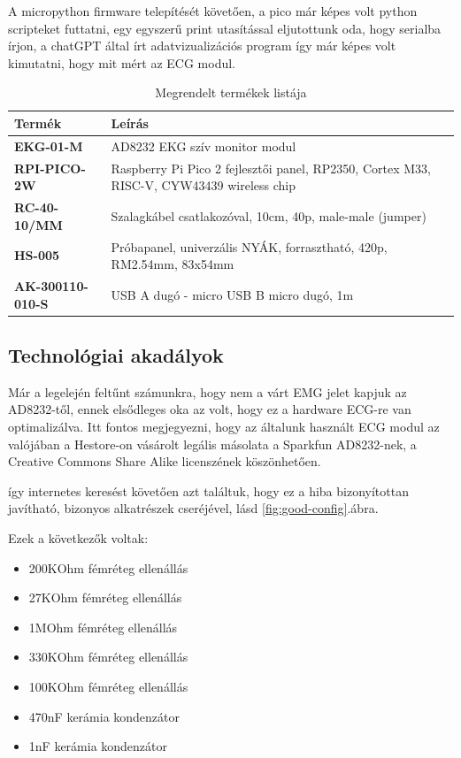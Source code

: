 A micropython firmware\cite{micropython} telepítését követően, a pico már képes volt python scripteket futtatni, egy egyszerű print utasítással eljutottunk oda, hogy serialba írjon, a chatGPT által írt adatvizualizációs program így már képes volt kimutatni, hogy mit mért az ECG modul.  
\begin{table}[H]
\centering
\begin{tabular}{|l|p{10cm}|}
\hline
\textbf{Termék} & \textbf{Leírás} \\
\hline
\textbf{EKG-01-M \cite{AD8232}} & AD8232 EKG szív monitor modul \\
\hline
\textbf{RPI-PICO-2W \cite{pico2w}} & Raspberry Pi Pico 2 fejlesztői panel, RP2350, Cortex M33, RISC-V, CYW43439 wireless chip \\
\hline
\textbf{RC-40-10/MM \cite{szalagkabel}} & Szalagkábel csatlakozóval, 10cm, 40p, male-male (jumper) \\
\hline
\textbf{HS-005 \cite{nyak}} & Próbapanel, univerzális NYÁK, forrasztható, 420p, RM2.54mm, 83x54mm \\
\hline
\textbf{AK-300110-010-S \cite{usb}} & USB A dugó - micro USB B micro dugó, 1m \\
\hline
\end{tabular}
\caption{Megrendelt termékek listája}
\end{table}


\subsection{Technológiai akadályok}
\label{sec:technologiai-akadalyok}

Már a legelején feltűnt számunkra, hogy nem a várt EMG jelet kapjuk az AD8232-től, ennek elsődleges oka az volt, hogy ez a hardware ECG-re van optimalizálva\cite{AD8232_datasheet}. Itt fontos megjegyezni, hogy az általunk használt ECG modul az valójában a Hestore-on vásárolt legális másolata a Sparkfun AD8232-nek, a Creative Commons Share Alike licenszének köszönhetően.\cite{AD8232_datasheet}

így internetes keresést követően azt találtuk, hogy ez a hiba bizonyítottan javítható, bizonyos alkatrészek cseréjével, lásd \ref{fig:good-config}.ábra.

Ezek a következők voltak:

\begin{itemize}
    \item 200KOhm fémréteg ellenállás
    \item 27KOhm fémréteg ellenállás
    \item 1MOhm fémréteg ellenállás
    \item 330KOhm fémréteg ellenállás
    \item 100KOhm fémréteg ellenállás
    \item 470nF kerámia kondenzátor
    \item 1nF kerámia kondenzátor
\end{itemize}


